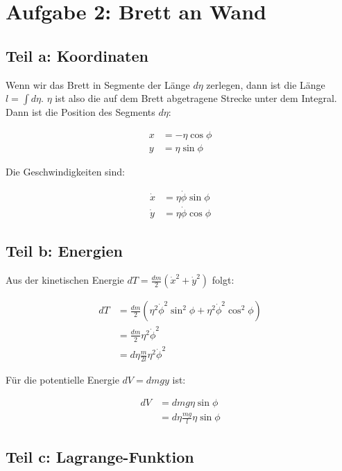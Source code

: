 \documentclass[a4paper,german,12pt,smallheadings]{scrartcl}
\begin{document}
\section*{Aufgabe 2: Brett an Wand}
\subsection*{Teil a: Koordinaten}

Wenn wir das Brett in Segmente der Länge $d \eta$ zerlegen, dann ist die Länge
$l = \int d \eta$. $\eta$ ist also die auf dem Brett abgetragene Strecke unter
dem Integral. Dann ist die Position des Segments $d \eta$:

\begin{align*}
  x &= - \eta \cos \phi \\
  y &= \eta \sin \phi
\end{align*}

Die Geschwindigkeiten sind:

\begin{align*}
  \dot{x} &= \eta \dot{\phi} \sin \phi \\
  \dot{y} &= \eta \dot{\phi} \cos \phi
\end{align*}


\subsection*{Teil b: Energien}

Aus der kinetischen Energie $dT = \frac{dm}{2}(\dot{x}^2 + \dot{y}^2)$ folgt:

\begin{align*}
  dT &= \frac{dm}{2}(\eta^2 \dot{\phi}^2 \sin^2 \phi + \eta^2 \dot{\phi}^2 \cos^2 \phi) \\
     &= \frac{dm}{2} \eta^2 \dot{\phi}^2 \\
     &= d \eta \frac{m}{2l} \eta^2 \dot{\phi}^2
\end{align*}

Für die potentielle Energie $dV = dm g y$ ist:

\begin{align*}
  dV &= dm g \eta \sin \phi \\
     &= d \eta \frac{mg}{l} \eta \sin \phi
\end{align*}

\subsection*{Teil c: Lagrange-Funktion}
\end{document}

